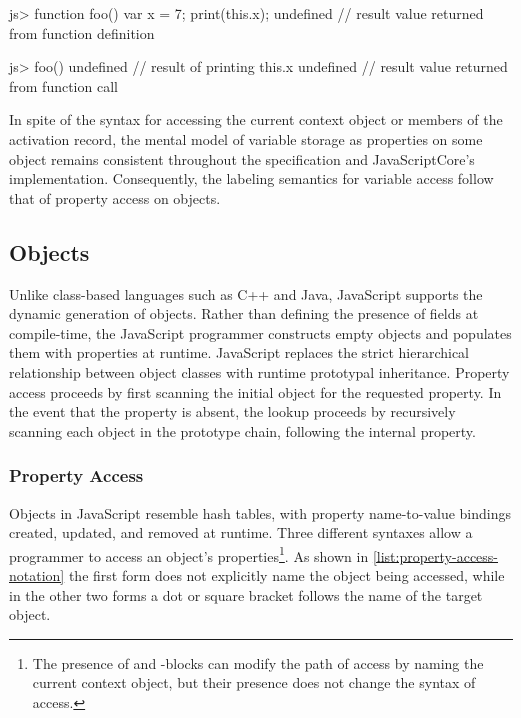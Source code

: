 \begin{jscode}
js> function foo() {
      var x = 7;
      print(this.x);
    }
undefined // result value returned from function definition

js> foo()
undefined // result of printing this.x
undefined // result value returned from function call
\end{jscode}

In spite of the syntax for accessing the current context object or members of the activation record, the mental model of variable storage as properties on some object remains consistent throughout the specification and JavaScriptCore's implementation.
Consequently, the labeling semantics for variable access follow that of property access on objects.

\subsection{Objects}

Unlike class-based languages such as C++ and Java, JavaScript supports the dynamic generation of objects.
Rather than defining the presence of fields at compile-time, the JavaScript programmer constructs empty objects and populates them with properties at runtime.
JavaScript replaces the strict hierarchical relationship between object classes with runtime prototypal inheritance.
Property access proceeds by first scanning the initial object for the requested property.
In the event that the property is absent, the lookup proceeds by recursively scanning each object in the prototype chain, following the internal  property.

\subsubsection{Property Access}

Objects in JavaScript resemble hash tables, with property name-to-value bindings created, updated, and removed at runtime.
Three different syntaxes allow a programmer to access an object's properties\footnote{The presence of  and -blocks can modify the path of access by naming the current context object, but their presence does not change the syntax of access.}.
As shown in \autoref{list:property-access-notation} the first form does not explicitly name the object being accessed, while in the other two forms a dot or square bracket follows the name of the target object.

